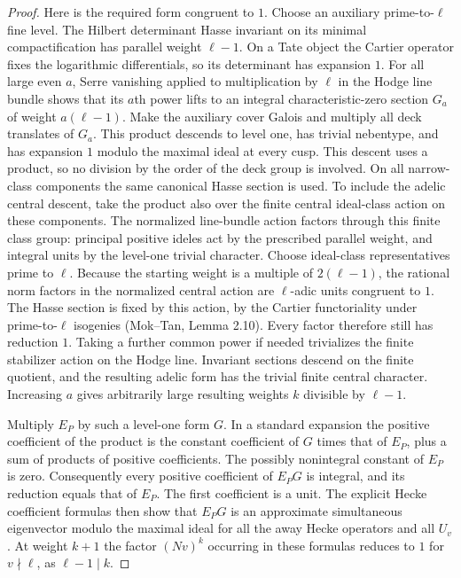 \begin{proof}
Here is the required form congruent to $1$.  Choose an auxiliary
prime-to-$\ell$ fine level.  The Hilbert determinant Hasse invariant
on its minimal compactification has parallel weight $\ell-1$.
On a Tate object the Cartier operator fixes the logarithmic
differentials, so its determinant has expansion $1$.  For all large
even $a$, Serre vanishing applied to multiplication by $\ell$ in the
Hodge line bundle shows that its $a$th power lifts to an integral
characteristic-zero section $G_a$ of weight $a(\ell-1)$.
Make the auxiliary cover Galois and multiply all deck translates
of $G_a$.  This product descends to level one, has trivial
nebentype, and has expansion $1$ modulo the maximal ideal at
every cusp.  This descent uses a product, so no division by the
order of the deck group is involved.  On all narrow-class components
the same canonical Hasse section is used.  To include the adelic
central descent, take the product also over the finite central
ideal-class action on these components.  The normalized line-bundle
action factors through this finite class group: principal positive
ideles act by the prescribed parallel weight, and integral units
by the level-one trivial character.  Choose ideal-class representatives
prime to $\ell$.  Because the starting weight is a multiple of
$2(\ell-1)$, the rational norm factors in the normalized central
action are $\ell$-adic units congruent to $1$.
The Hasse section is fixed
by this action, by the Cartier functoriality under prime-to-$\ell$
isogenies (Mok--Tan, Lemma 2.10).  Every factor therefore still
has reduction $1$.  Taking a further common power if needed
trivializes the finite stabilizer action on the Hodge line.
Invariant sections descend on the finite quotient, and the
resulting adelic form has the trivial finite central character.
Increasing $a$ gives
arbitrarily large resulting weights $k$ divisible by $\ell-1$.

Multiply $E_P$ by such a level-one form $G$.  In a standard expansion
the positive coefficient of the product is the constant coefficient
of $G$ times that of $E_P$, plus a sum of products of positive
coefficients.  The possibly nonintegral constant of $E_P$ is zero.
Consequently every positive coefficient of $E_PG$ is integral,
and its reduction equals that of $E_P$.  The first coefficient is a
unit.  The explicit Hecke coefficient formulas then show that
$E_PG$ is an approximate simultaneous eigenvector modulo the
maximal ideal for all the away Hecke operators and all $U_v$.
At weight $k+1$ the factor $(Nv)^k$ occurring in these formulas
reduces to $1$ for $v\nmid\ell$, as $\ell-1\mid k$.


\end{proof}
